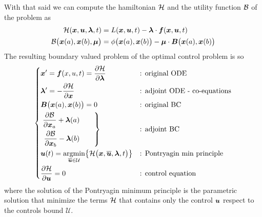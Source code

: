 	With that said we can compute the hamiltonian $\mathcal{H}$ and the utility function $\mathcal{B}$ of the problem as
	\begin{align*}
		\mathcal{H}(\boldsymbol{x}, \boldsymbol{u}, \boldsymbol{\lambda},t) & = L(\boldsymbol{x}, \boldsymbol{u}, t) - \boldsymbol{\lambda}\cdot \boldsymbol{f}(\boldsymbol{x}, \boldsymbol{u}, t) \\
		\mathcal{B}\big(\boldsymbol{x}(a),\boldsymbol{x}(b),\boldsymbol{\mu}\big) & = \phi\big(\boldsymbol{x}(a), \boldsymbol{x}(b) \big) - \boldsymbol{\mu} \cdot \boldsymbol{B}\big(\boldsymbol{x}(a),\boldsymbol{x}(b)\big)  
	\end{align*}
	The resulting boundary valued problem of the optimal control problem is so
	\[
	\left\{ \begin{aligned}
		& \boldsymbol{x}' = \boldsymbol{f}(x,u,t) = \frac{\partial \mathcal H}{\partial \boldsymbol{\lambda}} && \textrm{: original ODE} \\
		&\boldsymbol{\lambda}' = - \frac{\partial \mathcal H}{\partial \boldsymbol{x}} && \textrm{: adjoint ODE - co-equations} \\
		&\boldsymbol{B}\big(\boldsymbol{x}(a),\boldsymbol{x}(b)\big) = 0 && \textrm{: original BC} \\
		&\left. \begin{aligned}
			\frac{\partial \mathcal{B}}{\partial \boldsymbol{x}_a} + \boldsymbol{\lambda}(a) \\
			\frac{\partial \mathcal{B}}{\partial \boldsymbol{x}_b} - \boldsymbol{\lambda}(b)
		\end{aligned} \qquad \right\} &&\textrm{: adjoint BC} \\
		& \boldsymbol{u}(t) = \underset{\overline{\boldsymbol{u}} \in \mathcal U}{\textrm{argmin}} \big\{ \mathcal{H}\big(\boldsymbol{x}, \overline{\boldsymbol{u}},\boldsymbol{\lambda}, t\big) \big\} && \textrm{: Pontryagin min principle} \\
		& \frac{\partial \mathcal H}{\partial \boldsymbol{u}} = 0 && \textrm{: control equation}			
	\end{aligned} \right. \]
	where the solution of the Pontryagin minimum principle is the parametric solution that minimize the terms $\mathcal{H}$ that contains only the control $\boldsymbol{u}$ respect to the controls bound $\mathcal U$. 
	
	
	
	
	
	
	
	
	
	
	
	
	
	
	



